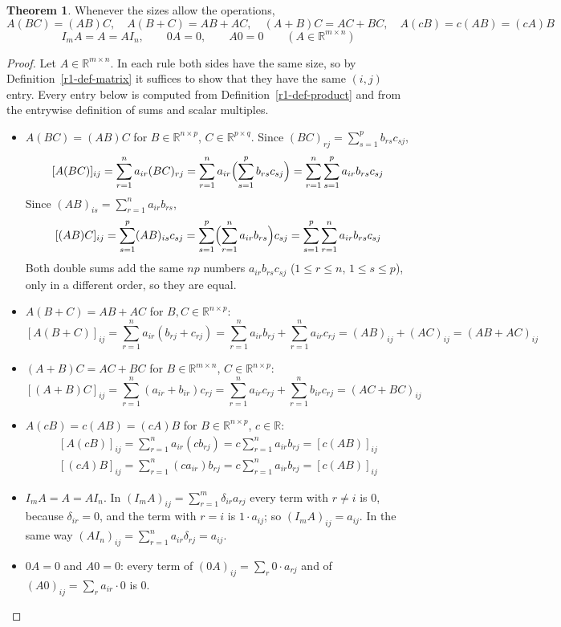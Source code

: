 \documentclass[12pt]{article}
\newcommand{\R}{\mathbb R}
\theoremstyle{definition}
\newtheorem{theorem}{Theorem}
\begin{document}
\begin{theorem}\label{r1-thm-rules}
Whenever the sizes allow the operations,
\[
A(BC)=(AB)C,\quad A(B+C)=AB+AC,\quad (A+B)C=AC+BC,\quad A(cB)=c(AB)=(cA)B
\]
\[
I_mA=A=AI_n,\qquad 0A=0,\qquad A0=0\qquad(A\in\R^{m\times n})
\]
\end{theorem}
\begin{proof}
Let \(A\in\R^{m\times n}\). In each rule both sides have the same size, so by
Definition~\ref{r1-def-matrix} it suffices to show that they have the same \((i,j)\) entry.
Every entry below is computed from Definition~\ref{r1-def-product} and from the entrywise
definition of sums and scalar multiples.
\begin{itemize}
\item \(A(BC)=(AB)C\) for \(B\in\R^{n\times p}\), \(C\in\R^{p\times q}\). Since
\((BC)_{rj}=\sum_{s=1}^p b_{rs}c_{sj}\),
\[
[A(BC)]_{ij}=\sum_{r=1}^n a_{ir}(BC)_{rj}=\sum_{r=1}^n a_{ir}\Bigl(\sum_{s=1}^p b_{rs}c_{sj}\Bigr)
=\sum_{r=1}^n\sum_{s=1}^p a_{ir}b_{rs}c_{sj}
\]
Since \((AB)_{is}=\sum_{r=1}^n a_{ir}b_{rs}\),
\[
[(AB)C]_{ij}=\sum_{s=1}^p (AB)_{is}c_{sj}=\sum_{s=1}^p\Bigl(\sum_{r=1}^n a_{ir}b_{rs}\Bigr)c_{sj}
=\sum_{s=1}^p\sum_{r=1}^n a_{ir}b_{rs}c_{sj}
\]
Both double sums add the same \(np\) numbers \(a_{ir}b_{rs}c_{sj}\)
(\(1\leqslant r\leqslant n\), \(1\leqslant s\leqslant p\)), only in a different order, so they
are equal.
\item \(A(B+C)=AB+AC\) for \(B,C\in\R^{n\times p}\):
\[
[A(B+C)]_{ij}=\sum_{r=1}^n a_{ir}(b_{rj}+c_{rj})=\sum_{r=1}^n a_{ir}b_{rj}+\sum_{r=1}^n a_{ir}c_{rj}
=(AB)_{ij}+(AC)_{ij}=(AB+AC)_{ij}
\]
\item \((A+B)C=AC+BC\) for \(B\in\R^{m\times n}\), \(C\in\R^{n\times p}\):
\[
[(A+B)C]_{ij}=\sum_{r=1}^n (a_{ir}+b_{ir})c_{rj}=\sum_{r=1}^n a_{ir}c_{rj}+\sum_{r=1}^n b_{ir}c_{rj}
=(AC+BC)_{ij}
\]
\item \(A(cB)=c(AB)=(cA)B\) for \(B\in\R^{n\times p}\), \(c\in\R\):
\[
\begin{gathered}
[A(cB)]_{ij}=\sum_{r=1}^n a_{ir}(cb_{rj})=c\sum_{r=1}^n a_{ir}b_{rj}=[c(AB)]_{ij}\\
[(cA)B]_{ij}=\sum_{r=1}^n (ca_{ir})b_{rj}=c\sum_{r=1}^n a_{ir}b_{rj}=[c(AB)]_{ij}
\end{gathered}
\]
\item \(I_mA=A=AI_n\). In \((I_mA)_{ij}=\sum_{r=1}^m\delta_{ir}a_{rj}\) every term with
\(r\ne i\) is \(0\), because \(\delta_{ir}=0\), and the term with \(r=i\) is
\(1\cdot a_{ij}\); so \((I_mA)_{ij}=a_{ij}\). In the same way
\((AI_n)_{ij}=\sum_{r=1}^n a_{ir}\delta_{rj}=a_{ij}\).
\item \(0A=0\) and \(A0=0\): every term of \((0A)_{ij}=\sum_r 0\cdot a_{rj}\) and of
\((A0)_{ij}=\sum_r a_{ir}\cdot0\) is \(0\).\qedhere
\end{itemize}
\end{proof}
\end{document}
